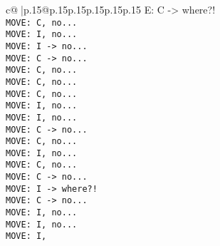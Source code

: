 \documentclass{article}
\begin{document}
{\begin{supertabular}{c@{$\;$}|p{.15\linewidth}@{}p{.15\linewidth}p{.15\linewidth}p{.15\linewidth}p{.15\linewidth}p{.15\linewidth}}
{{{E: C -> where?!\\ \tt  MOVE: C, no...\\ \tt  MOVE: I, no...\\ \tt  MOVE: I -> no...\\ \tt  MOVE: C -> no...\\ \tt  MOVE: C, no...\\ \tt  MOVE: C, no...\\ \tt  MOVE: C, no...\\ \tt  MOVE: I, no...\\ \tt  MOVE: I, no...\\ \tt  MOVE: C -> no...\\ \tt  MOVE: C, no...\\ \tt  MOVE: I, no...\\ \tt  MOVE: C, no...\\ \tt  MOVE: C -> no...\\ \tt  MOVE: I -> where?!\\ \tt  MOVE: C -> no...\\ \tt  MOVE: I, no...\\ \tt  MOVE: I, no...\\ \tt  MOVE: I,}}}
\end{supertabular}}
\end{document}
